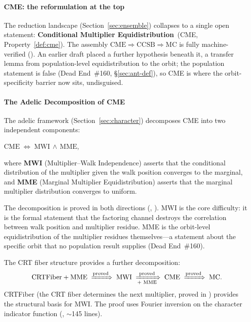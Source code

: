 \paragraph{CME: the reformulation at the top}

The reduction landscape (Section~\ref{sec:ensemble}) collapses to a
single open statement: \textbf{Conditional Multiplier
Equidistribution}~(CME, Property~\ref{def:cme}).  The assembly
$\mathrm{CME} \Rightarrow \mathrm{CCSB} \Rightarrow \mathrm{MC}$ is
fully machine-verified
().  An earlier draft
placed a further hypothesis beneath it, a transfer lemma from
population-level equidistribution to the orbit; the population
statement is false (Dead End~\#160, \S\ref{sec:ant-def}), so CME is
where the orbit-specificity barrier now sits, undisguised.

\paragraph{The Adelic Decomposition of CME}

The adelic framework (Section~\ref{sec:character}) decomposes CME into
two independent components:

\begin{theorem}
$\mathrm{CME} \;\Longleftrightarrow\; \mathrm{MWI} \,\wedge\, \mathrm{MME}$,
\end{theorem}

\noindent where \textbf{MWI} (Multiplier--Walk Independence) asserts
that the conditional distribution of the multiplier given the walk
position converges to the marginal, and \textbf{MME} (Marginal Multiplier
Equidistribution) asserts that the marginal multiplier distribution
converges to uniform.

The decomposition is proved in both directions
(, ).
MWI is the core difficulty: it is the formal statement that the
factoring channel destroys the correlation between walk position and
multiplier residue.  MME is the orbit-level equidistribution of the multiplier
residues themselves---a statement about the specific orbit that no
population result supplies (Dead End~\#160).

\noindent The CRT fiber structure provides a further decomposition:
\[
\mathrm{CRTFiber} + \mathrm{MME}
\;\xRightarrow{\text{proved}}\;
\mathrm{MWI}
\;\xRightarrow[\text{+ MME}]{\text{proved}}\;
\mathrm{CME}
\;\xRightarrow{\text{proved}}\;
\mathrm{MC}.
\]
CRTFiber (the CRT fiber determines the next multiplier, proved in
) provides the structural basis for MWI\@.
The proof uses Fourier inversion on the character indicator function
(, $\sim$145 lines).

